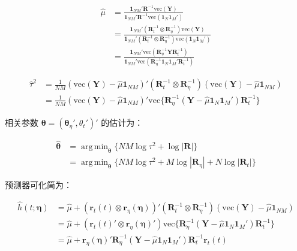 \documentclass{ctexart}
\DeclareMathOperator*{\argmin}{arg\,min}
\begin{document}
\begin{align*}
\widehat{\mu}&=\frac{\boldsymbol{1}_{NM}'\boldsymbol{R}^{-1}\mathrm{vec}(\boldsymbol{Y})}{\boldsymbol{1}_{NM}'\boldsymbol{R}^{-1}\mathrm{vec}(\boldsymbol{1}_N\boldsymbol{1}_M')}\\
&=\frac{\boldsymbol{1}_{NM}'(\boldsymbol{R}_t^{-1}\otimes\boldsymbol{R}_\eta^{-1})\mathrm{vec}(\boldsymbol{Y})}{\boldsymbol{1}_{NM}'(\boldsymbol{R}_t^{-1}\otimes\boldsymbol{R}_\eta^{-1})\mathrm{vec}(\boldsymbol{1}_N\boldsymbol{1}_M')}\\
&=\frac{\boldsymbol{1}_{NM}'\mathrm{vec}(\boldsymbol{R}_\eta^{-1}\boldsymbol{Y}\boldsymbol{R}_t^{-1})}{\boldsymbol{1}_{NM}'\mathrm{vec}(\boldsymbol{R}_\eta^{-1}\boldsymbol{1}_N\boldsymbol{1}_M'\boldsymbol{R}_t^{-1})}
\end{align*}

\begin{align*}
\widehat{\tau}^2&=\frac{1}{NM}(\mathrm{vec}(\boldsymbol{Y})-\widehat{\mu}\boldsymbol{1}_{NM})'(\boldsymbol{R}_t^{-1}\otimes\boldsymbol{R}_\eta^{-1})(\mathrm{vec}(\boldsymbol{Y})-\widehat{\mu}\boldsymbol{1}_{NM})\\
&=\frac{1}{NM}(\mathrm{vec}(\boldsymbol{Y})-\widehat{\mu}\boldsymbol{1}_{NM})'\mathrm{vec}\{\boldsymbol{R}_\eta^{-1}(\boldsymbol{Y}-\widehat{\mu}\boldsymbol{1}_N\boldsymbol{1}_M')\boldsymbol{R}_t^{-1}\}
\end{align*}

相关参数 $\boldsymbol{\theta}=(\boldsymbol{\theta}_\eta',\theta_t')'$ 的估计为：

\begin{align*}
\widehat{\boldsymbol{\theta}}&=\argmin_{\boldsymbol{\theta}}\{NM\log\tau^2+\log|\boldsymbol{R}|\}\\
&=\argmin_{\boldsymbol{\theta}}\{NM\log\tau^2+M\log|\boldsymbol{R}_\eta|+N\log|\boldsymbol{R}_t|\}
\end{align*}

预测器可化简为：

\begin{align*}
\widehat{h}(t;\boldsymbol{\eta})&=\widehat{\mu}+(\boldsymbol{r}_t(t)\otimes\boldsymbol{r}_\eta(\boldsymbol{\eta}))'(\boldsymbol{R}_t^{-1}\otimes\boldsymbol{R}_\eta^{-1})(\mathrm{vec}(\boldsymbol{Y})-\widehat{\mu}\boldsymbol{1}_{NM})\\
&=\widehat{\mu}+(\boldsymbol{r}_t(t)'\otimes\boldsymbol{r}_\eta(\boldsymbol{\eta})')\mathrm{vec}\{\boldsymbol{R}_\eta^{-1}(\boldsymbol{Y}-\widehat{\mu}\boldsymbol{1}_N\boldsymbol{1}_M')\boldsymbol{R}_t^{-1}\}\\
&=\widehat{\mu}+\boldsymbol{r}_\eta(\boldsymbol{\eta})'\boldsymbol{R}_\eta^{-1}(\boldsymbol{Y}-\widehat{\mu}\boldsymbol{1}_N\boldsymbol{1}_M')\boldsymbol{R}_t^{-1}\boldsymbol{r}_t(t)
\tag{9.14}
\end{align*}
\end{document}
